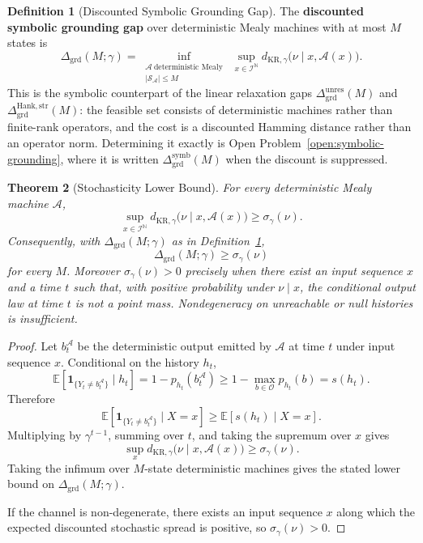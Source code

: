 \documentclass[12pt]{article}
\newtheorem{theorem}{Theorem}[section]
\theoremstyle{definition}
\newtheorem{definition}[theorem]{Definition}
\newcommand{\Dunres}{\Delta_{\mathrm{grd}}^{\mathrm{unres}}}
\newcommand{\DHankstr}{\Delta_{\mathrm{grd}}^{\mathrm{Hank,str}}}
\begin{document}
\begin{definition}[Discounted Symbolic Grounding Gap]
\label{def:symbolic-grounding-gap}
The \textbf{discounted symbolic grounding gap} over deterministic Mealy
machines with at most $M$ states is
\[
\Delta_{\mathrm{grd}}(M;\gamma)
=
\inf_{\substack{
\mathcal A\ \text{deterministic Mealy}\\
|\mathcal S_{\mathcal A}|\le M
}}
\ \sup_{x\in\mathcal I^{\mathbb N}}
d_{\mathrm{KR},\gamma}
\bigl(
\nu\mid x,\mathcal A(x)
\bigr).
\]
This is the symbolic counterpart of the linear relaxation gaps
$\Dunres(M)$ and $\DHankstr(M)$: the feasible set consists of deterministic
machines rather than finite-rank operators, and the cost is a discounted
Hamming distance rather than an operator norm.  Determining it exactly is
Open Problem~\ref{open:symbolic-grounding}, where it is written
$\Delta_{\mathrm{grd}}^{\mathrm{symb}}(M)$ when the discount is suppressed.
\end{definition}

\begin{theorem}[Stochasticity Lower Bound]
\label{thm:stochasticity}
For every deterministic Mealy machine $\mathcal A$,
\[
\sup_{x\in\mathcal I^{\mathbb N}}
d_{\mathrm{KR},\gamma}
\bigl(
\nu\mid x,\mathcal A(x)
\bigr)
\ge
\sigma_\gamma(\nu).
\]
Consequently, with $\Delta_{\mathrm{grd}}(M;\gamma)$ as in
Definition~\ref{def:symbolic-grounding-gap},
\[
\Delta_{\mathrm{grd}}(M;\gamma)
\ge
\sigma_\gamma(\nu)
\]
for every $M$.  Moreover $\sigma_\gamma(\nu)>0$ precisely when there exist an
input sequence $x$ and a time $t$ such that, with positive probability under
$\nu\mid x$, the conditional output law at time $t$ is not a point mass.
Nondegeneracy on unreachable or null histories is insufficient.
\end{theorem}

\begin{proof}
Let $b_t^{\mathcal A}$ be the deterministic output emitted by $\mathcal A$ at
time $t$ under input sequence $x$.  Conditional on the history $h_t$,
\[
\mathbb E[
\mathbf 1_{\{Y_t\neq b_t^{\mathcal A}\}}
\mid h_t
]
=
1-p_{h_t}(b_t^{\mathcal A})
\ge
1-\max_{b\in\mathcal O}p_{h_t}(b)
=
s(h_t).
\]
Therefore
\[
\mathbb E[
\mathbf 1_{\{Y_t\neq b_t^{\mathcal A}\}}
\mid X=x
]
\ge
\mathbb E[
s(h_t)\mid X=x
].
\]
Multiplying by $\gamma^{t-1}$, summing over $t$, and taking the supremum over
$x$ gives
\[
\sup_x
d_{\mathrm{KR},\gamma}
\bigl(
\nu\mid x,\mathcal A(x)
\bigr)
\ge
\sigma_\gamma(\nu).
\]
Taking the infimum over $M$-state deterministic machines gives the stated
lower bound on $\Delta_{\mathrm{grd}}(M;\gamma)$.

If the channel is non-degenerate, there exists an input sequence $x$ along
which the expected discounted stochastic spread is positive, so
$\sigma_\gamma(\nu)>0$.
\end{proof}
\end{document}
